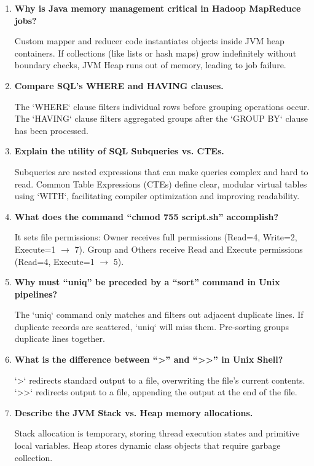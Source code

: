\documentclass[12pt,a4paper]{article}
\newcommand{\Q}[1]{\textbf{#1}\par\noindent\ignorespaces}
\begin{document}
\begin{tcolorbox}[exambox, title={\textbf{Frequently Asked / Viva Questions}}]
\begin{enumerate}[leftmargin=*, topsep=0pt, label=\textbf{Q\arabic*.}, itemsep=5pt]
  \item \Q{Why is Java memory management critical in Hadoop MapReduce jobs?}
        Custom mapper and reducer code instantiates objects inside JVM heap containers. If collections (like lists or hash maps) grow indefinitely without boundary checks, JVM Heap runs out of memory, leading to job failure.
        
  \item \Q{Compare SQL's WHERE and HAVING clauses.}
        The `WHERE` clause filters individual rows before grouping operations occur. The `HAVING` clause filters aggregated groups after the `GROUP BY` clause has been processed.
        
  \item \Q{Explain the utility of SQL Subqueries vs. CTEs.}
        Subqueries are nested expressions that can make queries complex and hard to read. Common Table Expressions (CTEs) define clear, modular virtual tables using `WITH`, facilitating compiler optimization and improving readability.
        
  \item \Q{What does the command ``chmod 755 script.sh'' accomplish?}
        It sets file permissions: Owner receives full permissions (Read=4, Write=2, Execute=1 $\to$ 7). Group and Others receive Read and Execute permissions (Read=4, Execute=1 $\to$ 5).
        
  \item \Q{Why must ``uniq'' be preceded by a ``sort'' command in Unix pipelines?}
        The `uniq` command only matches and filters out adjacent duplicate lines. If duplicate records are scattered, `uniq` will miss them. Pre-sorting groups duplicate lines together.
        
  \item \Q{What is the difference between ``>'' and ``>>'' in Unix Shell?}
        `>` redirects standard output to a file, overwriting the file's current contents. `>>` redirects output to a file, appending the output at the end of the file.
        
  \item \Q{Describe the JVM Stack vs. Heap memory allocations.}
        Stack allocation is temporary, storing thread execution states and primitive local variables. Heap stores dynamic class objects that require garbage collection.
        

\end{enumerate}
\end{tcolorbox}
\end{document}
